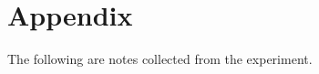 \documentclass[12pt,titlepage=false]{scrartcl}
\begin{document}
\section{Appendix}
\label{sec:appendix}
The following are notes collected from the experiment.

\end{document}
